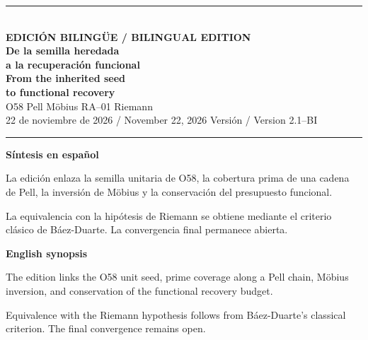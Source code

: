 \documentclass[11pt,a4paper]{article}
\begin{document}
\thispagestyle{empty}
\vspace*{7mm}
{\color{copper}\rule{31mm}{1.9pt}}\\[13pt]
{\sffamily\small\bfseries\color{copper} EDICIÓN BILINGÜE \; / \; BILINGUAL EDITION}\\[12pt]
{\fontsize{21}{25}\selectfont\bfseries\color{ink}De la semilla heredada\\ a la recuperación funcional}\\[12pt]
{\fontsize{17}{22}\selectfont\bfseries\color{ink}From the inherited seed\\ to functional recovery}\\[14pt]
{\color{slate}\large O58 \;\textbullet\; Pell \;\textbullet\; Möbius \;\textbullet\; RA--01 \;\textbullet\; Riemann}\\[12pt]
{\small 22 de noviembre de 2026 / November 22, 2026 \;\textbar\; Versión / Version 2.1--BI}\\[15pt]
{\color{ink}\rule{\linewidth}{.6pt}}
\vspace{9pt}
\begin{minipage}[t]{.47\linewidth}
{\bfseries\color{ink}Síntesis en español}\par\vspace{5pt}
La edición enlaza la semilla unitaria de O58, la cobertura prima de una cadena de Pell, la inversión de Möbius y la conservación del presupuesto funcional.

La equivalencia con la hipótesis de Riemann se obtiene mediante el criterio clásico de Báez-Duarte. La convergencia final permanece abierta.
\end{minipage}\hfill
\begin{minipage}[t]{.47\linewidth}
{\bfseries\color{ink}English synopsis}\par\vspace{5pt}
The edition links the O58 unit seed, prime coverage along a Pell chain, Möbius inversion, and conservation of the functional recovery budget.

Equivalence with the Riemann hypothesis follows from Báez-Duarte's classical criterion. The final convergence remains open.
\end{minipage}
\vspace{20pt}
\begin{center}
\end{center}
\end{document}
